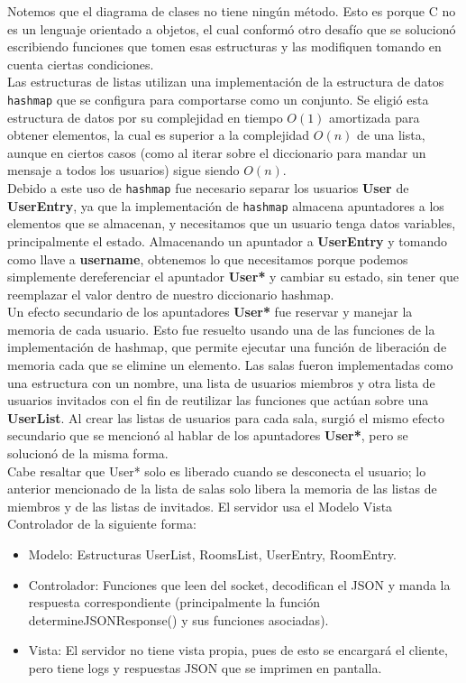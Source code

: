 \documentclass[12pt,a4paper]{article}
\begin{document}
Notemos que el diagrama de clases no tiene ningún método. Esto es porque C no es un lenguaje orientado a objetos, el cual conformó otro desafío que se solucionó escribiendo funciones que tomen esas estructuras y las modifiquen tomando en cuenta ciertas condiciones. \\
Las estructuras de listas utilizan una implementación de la estructura de datos \texttt{hashmap} que se configura para comportarse como un conjunto. Se eligió esta estructura de datos por su complejidad en tiempo $O(1)$ amortizada para obtener elementos, la cual es superior a la complejidad $O(n)$ de una lista, aunque en ciertos casos (como al iterar sobre el diccionario para mandar un mensaje a todos los usuarios) sigue siendo $O(n)$. \\
Debido a este uso de \texttt{hashmap} fue necesario separar los usuarios \textbf{User} de \textbf{UserEntry}, ya que la implementación de \texttt{hashmap} almacena apuntadores a los elementos que se almacenan, y necesitamos que un usuario tenga datos variables, principalmente el estado. Almacenando un apuntador a \textbf{UserEntry} y tomando como llave a \textbf{username}, obtenemos lo que necesitamos porque podemos simplemente dereferenciar el apuntador \textbf{User*} y cambiar su estado, sin tener que reemplazar el valor dentro de nuestro diccionario hashmap. \\
Un efecto secundario de los apuntadores \textbf{User*} fue reservar y manejar la memoria de cada usuario. Esto fue resuelto usando una de las funciones de la implementación de hashmap, que permite ejecutar una función de liberación de memoria cada que se elimine un elemento.
Las salas fueron implementadas como una estructura con un nombre, una lista de usuarios miembros y otra lista de usuarios invitados con el fin de reutilizar las funciones que actúan sobre una \textbf{UserList}. Al crear las listas de usuarios para cada sala, surgió el mismo efecto secundario que se mencionó al hablar de los apuntadores \textbf{User*}, pero se solucionó de la misma forma.\\
Cabe resaltar que User* solo es liberado cuando se desconecta el usuario; lo anterior mencionado de la lista de salas solo libera la memoria de las listas de miembros y de las listas de invitados.
El servidor usa el Modelo Vista Controlador de la siguiente forma:
\begin{itemize}
  \item Modelo: Estructuras UserList, RoomsList, UserEntry, RoomEntry.
  \item Controlador: Funciones que leen del socket, decodifican el JSON y manda la respuesta correspondiente (principalmente la función determineJSONResponse() y sus funciones asociadas).
  \item Vista: El servidor no tiene vista propia, pues de esto se encargará el cliente, pero tiene logs y respuestas JSON que se imprimen en pantalla.
\end{itemize}
\end{document}
